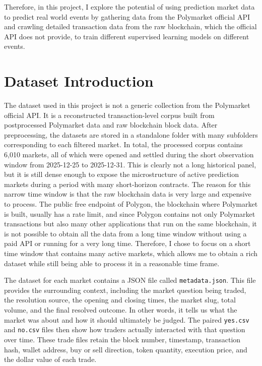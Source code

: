 \documentclass[11pt]{article}
\begin{document}
Therefore, in this project, I explore the potential of using prediction market data to predict real world events by gathering data from the Polymarket official API and crawling detailed transaction data from the raw blockchain, which the official API does not provide, to train different supervised learning models on different events.

\section{Dataset Introduction}

The dataset used in this project is not a generic collection from the Polymarket official API. It is a reconstructed transaction-level corpus built from postprocessed Polymarket data and raw blockchain block data. After preprocessing, the datasets are stored in a standalone folder with many subfolders corresponding to each filtered market. In total, the processed corpus contains 6,010 markets, all of which were opened and settled during the short observation window from 2025-12-25 to 2025-12-31. This is clearly not a long historical panel, but it is still dense enough to expose the microstructure of active prediction markets during a period with many short-horizon contracts. The reason for this narrow time window is that the raw blockchain data is very large and expensive to process. The public free endpoint of Polygon, the blockchain where Polymarket is built, usually has a rate limit, and since Polygon contains not only Polymarket transactions but also many other applications that run on the same blockchain, it is not possible to obtain all the data from a long time window without using a paid API or running for a very long time. Therefore, I chose to focus on a short time window that contains many active markets, which allows me to obtain a rich dataset while still being able to process it in a reasonable time frame.

The dataset for each market contains a JSON file called \texttt{metadata.json}. This file provides the surrounding context, including the market question being traded, the resolution source, the opening and closing times, the market slug, total volume, and the final resolved outcome. In other words, it tells us what the market was about and how it should ultimately be judged. The paired \texttt{yes.csv} and \texttt{no.csv} files then show how traders actually interacted with that question over time. These trade files retain the block number, timestamp, transaction hash, wallet address, buy or sell direction, token quantity, execution price, and the dollar value of each trade.
\end{document}

